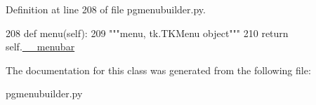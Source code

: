 Definition at line 208 of file pgmenubuilder.\+py.


\begin{DoxyCode}
208     \textcolor{keyword}{def }menu(self):
209         \textcolor{stringliteral}{"""menu, tk.TKMenu object"""}
210         \textcolor{keywordflow}{return} self.\hyperlink{classgui__frontend__popgen__program_1_1pgmenubuilder_1_1PGMenuBuilder_abc2334fcb2c9693bd6aae7f8fde48db9}{\_\_menubar}
\end{DoxyCode}


The documentation for this class was generated from the following file\+:\begin{DoxyCompactItemize}
\item 
pgmenubuilder.\+py\end{DoxyCompactItemize}
